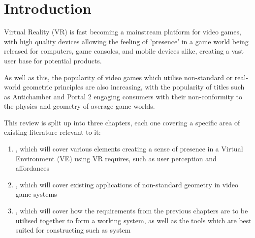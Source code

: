 \section{Introduction}
\label{lr:intro}
	
	Virtual Reality (VR) is fast becoming a mainstream platform for video games, with high quality devices allowing the feeling of 'presence' in a game world being released for computers, game consoles, and mobile devices alike, creating a vast user base for potential products.
	
	As well as this, the popularity of video games which utilise non-standard or real-world geometric principles are also increasing, with the popularity of titles such as Antichamber \cite{Antichamber2013} and Portal 2 \cite{Portal22011} engaging consumers with their non-conformity to the physics and geometry of average game worlds.
	
	This review is split up into three chapters, each one covering a specific area of existing literature relevant to it:
	\begin{enumerate}
		\item {}, which will cover various elements creating a sense of presence in a Virtual Environment (VE) using VR requires, such as user perception and affordances
		\item {}, which will cover existing applications of non-standard geometry in video game systems
		\item {}, which will cover how the requirements from the previous chapters are to be utilised together to form a working system, as well as the tools which are best suited for constructing such as system
	\end{enumerate}
	
